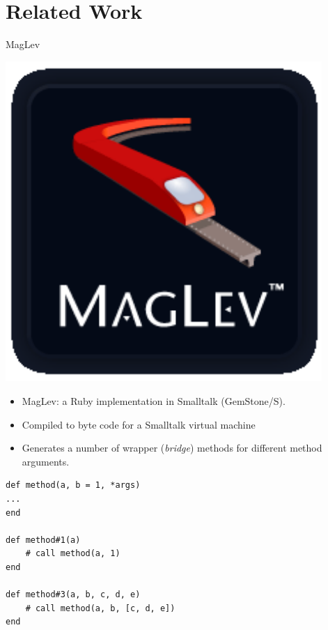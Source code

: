\documentclass[xcolor=dvipsname]{beamer} %
\begin{document}
\section{Related Work}
\begin{frame}[fragile]{MagLev}
\begin{minipage}{0.15\textwidth}
\centering
\includegraphics[width=0.9\textwidth]{maglev-logo.png}
\end{minipage} %
\begin{minipage}{0.8\textwidth}
\begin{itemize}
	\item MagLev: a Ruby implementation in Smalltalk (GemStone/S).
	\item Compiled to byte code for a Smalltalk virtual machine
	\item Generates a number of wrapper (\emph{bridge}) methods for different method arguments.
\end{itemize}
\end{minipage}

\begin{lstlisting}
def method(a, b = 1, *args)
...
end

def method#1(a)
	# call method(a, 1)
end

def method#3(a, b, c, d, e)
	# call method(a, b, [c, d, e])
end
\end{lstlisting}
\end{frame}
\end{document}
